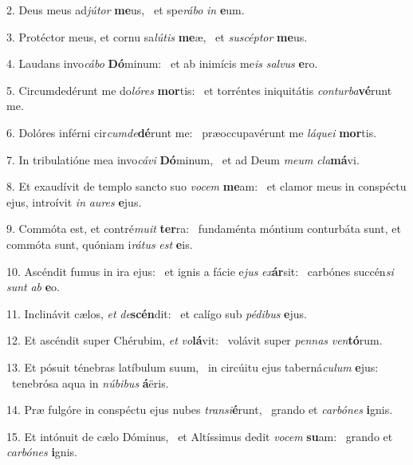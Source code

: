 2. Deus meus ad\textit{jú}\textit{tor} \textbf{me}us, \ast\  et spe\textit{rá}\textit{bo} \textit{in} \textbf{e}um.\

3. Protéctor meus, et cornu sa\textit{lú}\textit{tis} \textbf{me}æ, \ast\  et \textit{su}\textit{scép}\textit{tor} \textbf{me}us.\

4. Laudans invo\textit{cá}\textit{bo} \textbf{Dó}minum: \ast\  et ab inimícis me\textit{is} \textit{sal}\textit{vus} \textbf{e}ro.\

5. Circumdedérunt me do\textit{ló}\textit{res} \textbf{mor}tis: \ast\  et torréntes iniquitátis \textit{con}\textit{tur}\textit{ba}\textbf{vé}runt me.\

6. Dolóres inférni cir\textit{cum}\textit{de}\textbf{dé}runt me: \ast\  præoccupavérunt me \textit{lá}\textit{que}\textit{i} \textbf{mor}tis.\

7. In tribulatióne mea invo\textit{cá}\textit{vi} \textbf{Dó}minum, \ast\  et ad Deum \textit{me}\textit{um} \textit{cla}\textbf{má}vi.\

8. Et exaudívit de templo sancto suo \textit{vo}\textit{cem} \textbf{me}am: \ast\  et clamor meus in conspéctu ejus, introívit \textit{in} \textit{au}\textit{res} \textbf{e}jus.\

9. Commóta est, et contré\textit{mu}\textit{it} \textbf{ter}ra: \ast\  fundaménta móntium conturbáta sunt, et commóta sunt, quóniam i\textit{rá}\textit{tus} \textit{est} \textbf{e}is.\

10. Ascéndit fumus in ira ejus: \dag\  et ignis a fácie e\textit{jus} \textit{ex}\textbf{ár}sit: \ast\  carbónes succén\textit{si} \textit{sunt} \textit{ab} \textbf{e}o.\

11. Inclinávit cælos, \textit{et} \textit{de}\textbf{scén}dit: \ast\  et calígo sub \textit{pé}\textit{di}\textit{bus} \textbf{e}jus.\

12. Et ascéndit super Chérubim, \textit{et} \textit{vo}\textbf{lá}vit: \ast\  volávit super \textit{pen}\textit{nas} \textit{ven}\textbf{tó}rum.\

13. Et pósuit ténebras latíbulum suum, \dag\  in circúitu ejus taberná\textit{cu}\textit{lum} \textbf{e}jus: \ast\  tenebrósa aqua in \textit{nú}\textit{bi}\textit{bus} \textbf{á}ëris.\

14. Præ fulgóre in conspéctu ejus nubes \textit{trans}\textit{i}\textbf{é}runt, \ast\  grando et \textit{car}\textit{bó}\textit{nes} \textbf{i}gnis.\

15. Et intónuit de cælo Dóminus, \dag\  et Altíssimus dedit \textit{vo}\textit{cem} \textbf{su}am: \ast\  grando et \textit{car}\textit{bó}\textit{nes} \textbf{i}gnis.\

